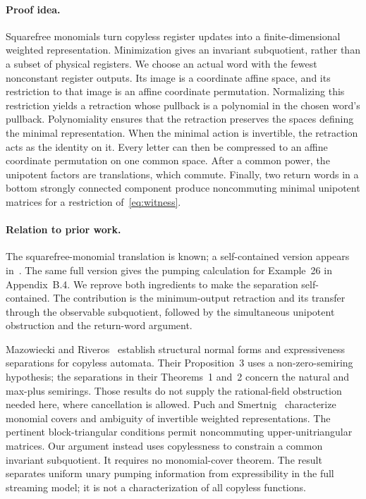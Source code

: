 \documentclass[acmlarge,screen,11pt,nonacm]{acmart}
\theoremstyle{definition}
\begin{document}
\paragraph{Proof idea.}
Squarefree monomials turn copyless register updates into a finite-dimensional weighted representation. Minimization gives an invariant subquotient, rather than a subset of physical registers. We choose an actual word with the fewest nonconstant register outputs. Its image is a coordinate affine space, and its restriction to that image is an affine coordinate permutation. Normalizing this restriction yields a retraction whose pullback is a polynomial in the chosen word's pullback. Polynomiality ensures that the retraction preserves the spaces defining the minimal representation. When the minimal action is invertible, the retraction acts as the identity on it. Every letter can then be compressed to an affine coordinate permutation on one common space. After a common power, the unipotent factors are translations, which commute. Finally, two return words in a bottom strongly connected component produce noncommuting minimal unipotent matrices for a restriction of~\eqref{eq:witness}.

\paragraph{Relation to prior work.}
The squarefree-monomial translation is known; a self-contained version appears in~\cite[Lemma~50, Appendix~B.1]{MPSfull}. The same full version gives the pumping calculation for Example~26 in Appendix~B.4. We reprove both ingredients to make the separation self-contained. The contribution is the minimum-output retraction and its transfer through the observable subquotient, followed by the simultaneous unipotent obstruction and the return-word argument.

Mazowiecki and Riveros~\cite{MR19} establish structural normal forms and expressiveness separations for copyless automata. Their Proposition~3 uses a non-zero-semiring hypothesis; the separations in their Theorems~1 and~2 concern the natural and max-plus semirings. Those results do not supply the rational-field obstruction needed here, where cancellation is allowed. Puch and Smertnig~\cite[Theorem~3.4, Corollary~3.5, Proposition~9.4]{PS24} characterize monomial covers and ambiguity of invertible weighted representations. The pertinent block-triangular conditions permit noncommuting upper-unitriangular matrices. Our argument instead uses copylessness to constrain a common invariant subquotient. It requires no monomial-cover theorem. The result separates uniform unary pumping information from expressibility in the full streaming model; it is not a characterization of all copyless functions.
\end{document}
